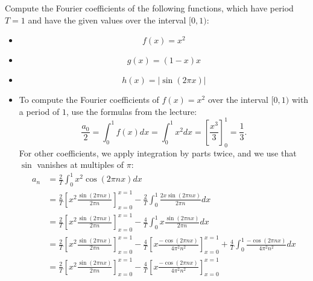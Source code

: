\documentclass[11pt]{article}
\begin{document}
\begin{exercise}
    Compute the Fourier coefficients of the following functions, which have period $T = 1$ and have the given values over the interval $[0,1)$:
    \begin{itemize}
     \item 
     \[
        f(x) = x^{2}
     \]
     \item 
     \[
        g(x) = (1-x)x
     \]
     \item 
     \[
        h(x) = |\sin( 2 \pi x )|
     \]
    \end{itemize}
\end{exercise}
\begin{solution}     
    \begin{itemize}
        \item 
        To compute the Fourier coefficients of $f(x) = x^2$ over the interval $[0,1)$ with a period of $1$, use the formulas from the lecture:
        \[
            \frac{a_0}{2} = \int_{0}^{1} f(x) dx  = \int_{0}^{1} x^2 dx  = \left[ \frac{x^3}{3} \right]_{0}^{1} = \frac 1 3.
        \]
        For other coefficients, we apply integration by parts twice, and we use that $\sin$ vanishes at multiples of $\pi$:
        \begin{align*}
            a_n 
            &
            = 
            \frac{2}{T}
            \int_{0}^{1} x^2 \cos(2\pi n x) dx
            \\&
            =
            \frac{2}{T}
            \left[ x^2 \frac{ \sin(2\pi n x) }{ 2\pi n } \right]_{x=0}^{x=1}
            -
            \frac{2}{T}
            \int_{0}^{1} \frac{ 2x \sin(2\pi n x) }{ 2\pi n } dx
            \\&
            =
            \frac{2}{T}
            \left[ x^2 \frac{ \sin(2\pi n x) }{ 2\pi n } \right]_{x=0}^{x=1}
            -
            \frac{4}{T}
            \int_{0}^{1} x \frac{ \sin(2\pi n x) }{ 2\pi n } dx
            \\&
            =
            \frac{2}{T}
            \left[ x^2 \frac{ \sin(2\pi n x) }{ 2\pi n } \right]_{x=0}^{x=1}
            -
            \frac{4}{T}
            \left[ x \frac{ -\cos(2\pi n x) }{ 4\pi^2 n^2 } \right]_{x=0}^{x=1}
            +
            \frac{4}{T}
            \int_{0}^{1} \frac{ -\cos(2\pi n x) }{ 4\pi^2 n^2 } dx
            \\&
            =
            \frac{2}{T}
            \left[ x^2 \frac{ \sin(2\pi n x) }{ 2\pi n } \right]_{x=0}^{x=1}
            -
            \frac{4}{T}
            \left[ x \frac{ -\cos(2\pi n x) }{ 4\pi^2 n^2 } \right]_{x=0}^{x=1}

\end{align*}
\end{itemize}
\end{solution}
\end{document}
